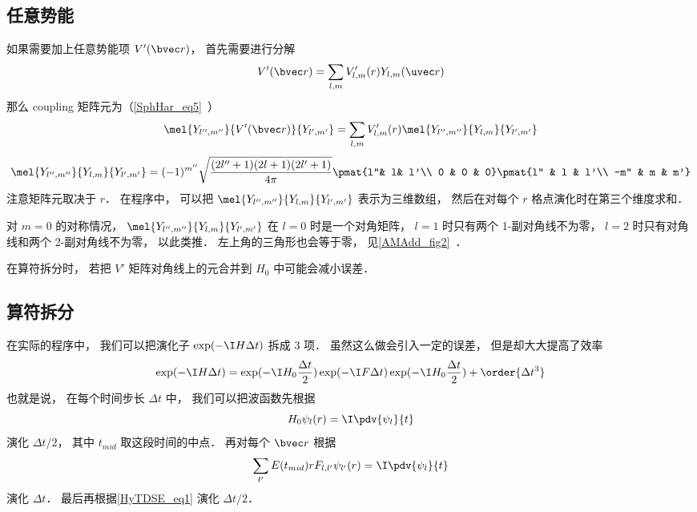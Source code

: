 \subsection{任意势能}
如果需要加上任意势能项 $V'(\bvec r)$， 首先需要进行分解
\begin{equation}\label{HyTDSE_eq6}
V'(\bvec r) = \sum_{l,m} V'_{l,m}(r) Y_{l,m}(\uvec r)
\end{equation}
那么 coupling 矩阵元为（\autoref{SphHar_eq5}~）
\begin{equation}\label{HyTDSE_eq5}
\mel{Y_{l'',m''}}{V'(\bvec r)}{Y_{l',m'}} = \sum_{l,m} V'_{l,m}(r) \mel{Y_{l'',m''}}{Y_{l,m}}{Y_{l',m'}}
\end{equation}
\begin{equation}
\mel{Y_{l'',m''}}{Y_{l,m}}{Y_{l',m'}} = (-1)^{m''}\sqrt{\frac{(2l''+1)(2l+1)(2l'+1)}{4\pi}} \pmat{l''& l& l'\\ 0 & 0 & 0}\pmat{l'' & l & l'\\  -m'' & m & m'}
\end{equation}
注意矩阵元取决于 $r$． 在程序中， 可以把 $\mel{Y_{l'',m''}}{Y_{l,m}}{Y_{l',m'}}$ 表示为三维数组， 然后在对每个 $r$ 格点演化时在第三个维度求和．

对 $m = 0$ 的对称情况， $\mel{Y_{l'',m''}}{Y_{l,m}}{Y_{l',m'}}$ 在 $l = 0$ 时是一个对角矩阵， $l = 1$ 时只有两个 1-副对角线不为零， $l = 2$ 时只有对角线和两个 2-副对角线不为零， 以此类推． 左上角的三角形也会等于零， 见\autoref{AMAdd_fig2}~．

在算符拆分时， 若把 $V'$ 矩阵对角线上的元合并到 $H_0$ 中可能会减小误差．

\subsection{算符拆分}
在实际的程序中， 我们可以把演化子 $\exp(-\I H \Delta t)$ 拆成 3 项． 虽然这么做会引入一定的误差， 但是却大大提高了效率
\begin{equation}\label{HyTDSE_eq2}
\exp(-\I H \Delta t) = \exp(-\I H_0 \frac{\Delta t}{2}) \exp(-\I F \Delta t)\exp(-\I H_0 \frac{\Delta t}{2}) + \order{\Delta t^3}
\end{equation}
也就是说， 在每个时间步长 $\Delta t$ 中， 我们可以把波函数先根据
\begin{equation}\label{HyTDSE_eq1}
H_0 \psi_{l}(r) = \I \pdv{\psi_{l}}{t}
\end{equation}
演化 $\Delta t/2$， 其中 $t_{mid}$ 取这段时间的中点． 再对每个 $\bvec r$ 根据
\begin{equation}
\sum_{l'} E(t_{mid})rF_{l, l'} \psi_{l'}(r) = \I \pdv{\psi_{l}}{t}
\end{equation}
演化 $\Delta t$． 最后再根据\autoref{HyTDSE_eq1} 演化 $\Delta t/2$．


